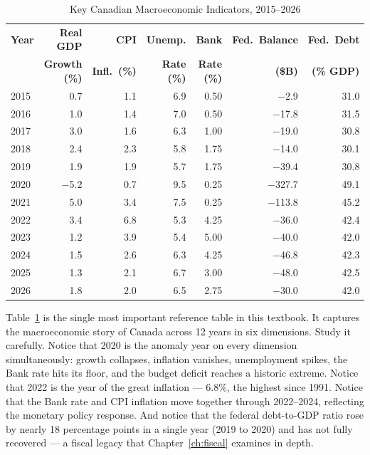 \begin{table}[H]
\centering
\caption{Key Canadian Macroeconomic Indicators, 2015--2026}
\label{tab:macro_indicators}
\renewcommand{\arraystretch}{1.30}
\begin{tabular}{lrrrrrr}
\toprule
\textbf{Year} & \textbf{Real GDP} & \textbf{CPI} & \textbf{Unemp.}
              & \textbf{Bank} & \textbf{Fed.\ Balance} & \textbf{Fed.\ Debt} \\
              & \textbf{Growth (\%)} & \textbf{Infl.\ (\%)} & \textbf{Rate (\%)}
              & \textbf{Rate (\%)} & \textbf{(\$B)} & \textbf{(\% GDP)} \\
\midrule
2015 & 0.7  & 1.1  & 6.9 & 0.50 & $-$2.9   & 31.0 \\
2016 & 1.0  & 1.4  & 7.0 & 0.50 & $-$17.8  & 31.5 \\
2017 & 3.0  & 1.6  & 6.3 & 1.00 & $-$19.0  & 30.8 \\
2018 & 2.4  & 2.3  & 5.8 & 1.75 & $-$14.0  & 30.1 \\
2019 & 1.9  & 1.9  & 5.7 & 1.75 & $-$39.4  & 30.8 \\
2020 & $-$5.2 & 0.7 & 9.5 & 0.25 & $-$327.7 & 49.1 \\
2021 & 5.0  & 3.4  & 7.5 & 0.25 & $-$113.8 & 45.2 \\
2022 & 3.4  & 6.8  & 5.3 & 4.25 & $-$36.0  & 42.4 \\
2023 & 1.2  & 3.9  & 5.4 & 5.00 & $-$40.0  & 42.0 \\
2024 & 1.5  & 2.6  & 6.3 & 4.25 & $-$46.8  & 42.3 \\
2025 & 1.3  & 2.1  & 6.7 & 3.00 & $-$48.0  & 42.5 \\
2026 & 1.8  & 2.0  & 6.5 & 2.75 & $-$30.0  & 42.0 \\
\bottomrule
\end{tabular}
\end{table}

\noindent Table~\ref{tab:macro_indicators} is the single most important
reference table in this textbook. It captures the macroeconomic story of
Canada across 12 years in six dimensions. Study it carefully. Notice that
2020 is the anomaly year on every dimension simultaneously: growth collapses,
inflation vanishes, unemployment spikes, the Bank rate hits its floor, and
the budget deficit reaches a historic extreme. Notice that 2022 is the
year of the great inflation --- 6.8\%, the highest since 1991. Notice that
the Bank rate and CPI inflation move together through 2022--2024, reflecting
the monetary policy response. And notice that the federal debt-to-GDP ratio
rose by nearly 18 percentage points in a single year (2019 to 2020) and
has not fully recovered --- a fiscal legacy that Chapter~\ref{ch:fiscal}
examines in depth.

